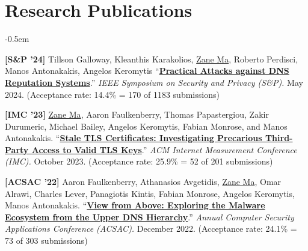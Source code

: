 \documentclass[10pt,singlecolumn]{article} %
\begin{document}

\section{Research Publications} 

\begin{etaremune}
\itemsep -0.5em 

\item \textbf{[S\&P '24]} 
Tillson Galloway, Kleanthis Karakolios, \underline{Zane Ma}, Roberto Perdisci, Manos Antonakakis, Angelos Keromytis
``\textbf{\href{https://zanema.com/papers/sp24_dns_reputation_attacks.pdf}{Practical Attacks against DNS Reputation Systems}}.''
\emph{IEEE Symposium on Security and Privacy (S\&P).} May 2024.
(Acceptance rate: 14.4\% = 170 of 1183 submissions)
\vspace{6pt}


\item \textbf{[IMC '23]} 
\underline{Zane Ma}, Aaron Faulkenberry, Thomas Papastergiou, Zakir Durumeric, Michael Bailey, Angelos Keromytis, Fabian Monrose, and Manos Antonakakis.
``\textbf{\href{https://zanema.com/papers/imc23_stale_certs.pdf}{Stale TLS Certificates: Investigating Precarious Third-Party Access to Valid TLS Keys}}.''
\emph{ACM Internet Measurement Conference (IMC).} October 2023.
(Acceptance rate: 25.9\% = 52 of 201 submissions)
\vspace{6pt}


\item \textbf{[ACSAC '22]} 
Aaron Faulkenberry, Athanasios Avgetidis, \underline{Zane Ma}, Omar Alrawi, Charles Lever, Panagiotis Kintis, Fabian Monrose, Angelos Keromytis, Manos Antonakakis.
``\textbf{\href{https://zanema.com/papers/acsac22_authdns.pdf}{View from Above: Exploring the Malware Ecosystem from the Upper DNS Hierarchy}}.''
\emph{Annual Computer Security Applications Conference (ACSAC).} December 2022.
(Acceptance rate: 24.1\% = 73 of 303 submissions)
\vspace{6pt}




\end{etaremune}
\end{document}
